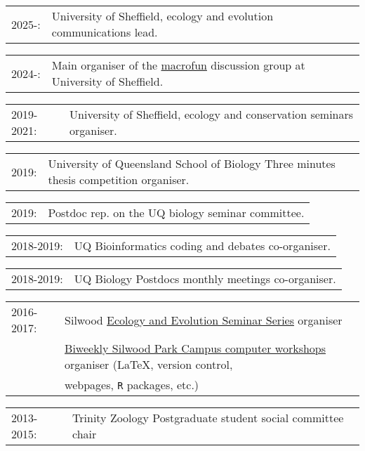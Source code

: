 \documentclass[10pt,a4paper]{article}
\begin{document}
{\begin{tabular}{ll}
2025-: & University of Sheffield, ecology and evolution communications lead.\\
\end{tabular}
\begin{tabular}{ll}
2024-: & Main organiser of the \href{http://macrofun-sheffield.github.io}{macrofun} discussion group at University of Sheffield.\\
\end{tabular}
\begin{tabular}{ll}
2019-2021: & University of Sheffield, ecology and conservation seminars organiser.\\
\end{tabular}
\begin{tabular}{ll}
2019: & University of Queensland School of Biology Three minutes thesis competition organiser.\\
\end{tabular}
\begin{tabular}{ll}
2019: & Postdoc rep. on the UQ biology seminar committee.\\
\end{tabular}
\begin{tabular}{ll}
2018-2019: & UQ Bioinformatics coding and debates co-organiser.\\
\end{tabular}
\begin{tabular}{ll}
2018-2019: & UQ Biology Postdocs monthly meetings co-organiser.\\
\end{tabular}
\begin{tabular}{ll}
2016-2017: & Silwood \href{http://www.imperial.ac.uk/silwood-park/research/thursday-seminars/}{Ecology and Evolution Seminar Series} organiser\\
    & \href{https://silwoodcomputerskillz.github.io/}{Biweekly Silwood Park Campus computer workshops} organiser (\LaTeX, version control,\\
    & webpages, \texttt{R} packages, etc.) \\
\end{tabular}
\begin{tabular}{ll}
2013-2015: & Trinity Zoology Postgraduate student social committee chair \\
\end{tabular}
\bigskip

}
\end{document}
